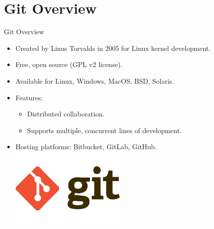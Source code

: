 \section{Git Overview}
\begin{frame}{Git Overview}
  \begin{itemize}
    \item Created by Linus Torvalds in 2005 for Linux kernel development.
    \item Free, open source (GPL v2 license).
    \item Available for Linux, Windows, MacOS, BSD, Solaris.
    \item Features:
    \begin{itemize}
      \item Distributed collaboration.
      \item Supports multiple, concurrent lines of development.
    \end{itemize}
    \item Hosting platforms: Bitbucket, GitLab, GitHub.
    \includegraphics[width=0.5\linewidth]{trainingmaterials/git-I/giticon.pdf}
  \end{itemize}
\end{frame}


